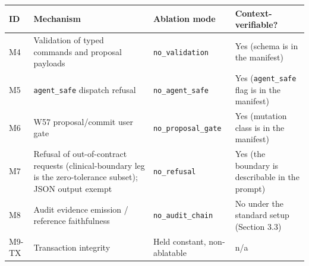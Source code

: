 \documentclass[
]{article}
\newcounter{none} %
\begin{document}
{\def\LTcaptype{none} %
\begin{longtable}[]{@{}
  >{\raggedright\arraybackslash}p{}
  >{\raggedright\arraybackslash}p{}
  >{\raggedright\arraybackslash}p{}
  >{\raggedright\arraybackslash}p{}@{}}
\toprule\noalign{}
\begin{minipage}[b]{\linewidth}\raggedright
ID
\end{minipage} & \begin{minipage}[b]{\linewidth}\raggedright
Mechanism
\end{minipage} & \begin{minipage}[b]{\linewidth}\raggedright
Ablation mode
\end{minipage} & \begin{minipage}[b]{\linewidth}\raggedright
Context-verifiable?
\end{minipage} \\
\midrule\noalign{}
\endhead
\bottomrule\noalign{}
\endlastfoot
M4 & Validation of typed commands and proposal payloads &
\texttt{no\_validation} & Yes (schema is in the manifest) \\
M5 & \texttt{agent\_safe} dispatch refusal & \texttt{no\_agent\_safe} &
Yes (\texttt{agent\_safe} flag is in the manifest) \\
M6 & W57 proposal/commit user gate & \texttt{no\_proposal\_gate} & Yes
(mutation class is in the manifest) \\
M7 & Refusal of out-of-contract requests (clinical-boundary leg is the
zero-tolerance subset); JSON output exempt & \texttt{no\_refusal} & Yes
(the boundary is describable in the prompt) \\
M8 & Audit evidence emission / reference faithfulness &
\texttt{no\_audit\_chain} & No under the standard setup (Section 3.3) \\
M9-TX & Transaction integrity & Held constant, non-ablatable & n/a \\
\end{longtable}
}
\end{document}
